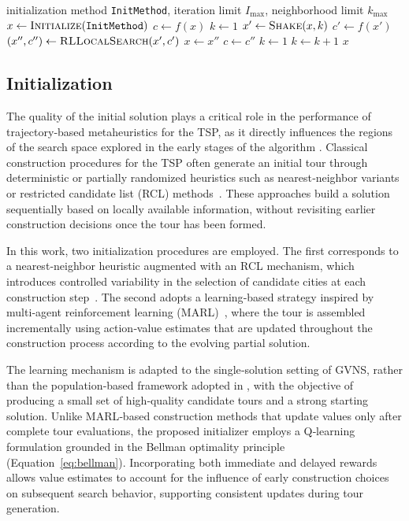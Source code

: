 \documentclass[runningheads]{llncs}
\begin{document}
\begin{algorithm}[ht]
\caption{GVNS with RL-driven Local Search}
\label{alg:gvns_rl}
\begin{algorithmic}[1]
\Require initialization method \texttt{InitMethod}, iteration limit $I_{\max}$, neighborhood limit $k_{\max}$
\State $x \gets \textsc{Initialize}(\texttt{InitMethod})$
\State $c \gets f(x)$
  \State $k \gets 1$
    \State $x' \gets \textsc{Shake}(x,k)$
    \State $c' \gets f(x')$
    \State $(x'',c'') \gets \textsc{RLLocalSearch}(x',c')$
      \State $x \gets x''$
      \State $c \gets c''$
      \State $k \gets 1$ 
    \Else
      \State $k \gets k + 1$
    \EndIf
  \EndWhile
\EndFor
\State \Return $x$
\end{algorithmic}
\end{algorithm}

\subsection{Initialization}
\label{subsec:initialization}
The quality of the initial solution plays a critical role in the performance of trajectory‑based metaheuristics for the TSP, as it directly influences the regions of the search space explored in the early stages of the algorithm \cite{Perttunen1994}. Classical construction procedures for the TSP often generate an initial tour through deterministic or partially randomized heuristics such as nearest‑neighbor variants or restricted candidate list (RCL) methods~\cite{Basu2008}. 
These approaches build a solution sequentially based on locally available information, without revisiting earlier construction decisions once the tour has been formed.

In this work, two initialization procedures are employed. 
The first corresponds to a nearest‑neighbor heuristic augmented with an RCL mechanism, which introduces controlled variability in the selection of candidate cities at each construction step~\cite{Basu2008}. 
The second adopts a learning‑based strategy inspired by multi‑agent reinforcement learning (MARL)~\cite{Alipour2015}, where the tour is assembled incrementally using action‑value estimates that are updated throughout the construction process according to the evolving partial solution.

The learning mechanism is adapted to the single‑solution setting of GVNS, rather than the population‑based framework adopted in \cite{Alipour2015}, with the objective of producing a small set of high‑quality candidate tours and a strong starting solution. Unlike MARL‑based construction methods that update values only after complete tour evaluations, the proposed initializer employs a Q‑learning formulation grounded in the Bellman optimality principle (Equation~\ref{eq:bellman}). Incorporating both immediate and delayed rewards allows value estimates to account for the influence of early construction choices on subsequent search behavior, supporting consistent updates during tour generation.
\end{document}
